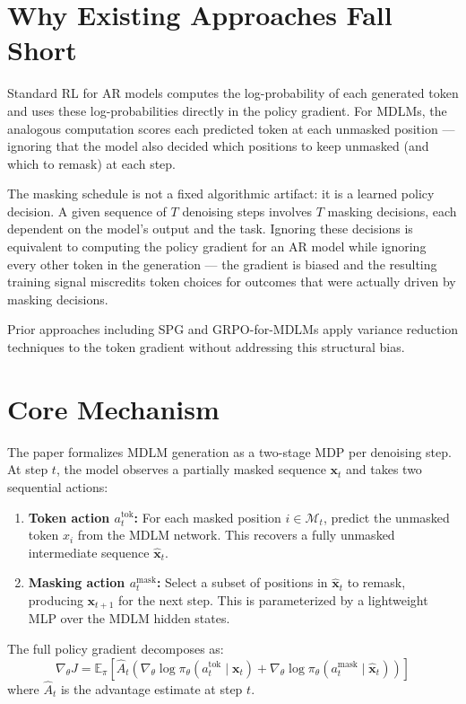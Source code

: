 \documentclass[10pt,twocolumn]{article}
\begin{document}
\section{Why Existing Approaches Fall Short}

Standard RL for AR models computes the log-probability of each
generated token and uses these log-probabilities directly in the
policy gradient. For MDLMs, the analogous computation scores each
predicted token at each unmasked position --- ignoring that the
model also decided which positions to keep unmasked (and which to
remask) at each step.

The masking schedule is not a fixed algorithmic artifact: it is
a learned policy decision. A given sequence of $T$ denoising steps
involves $T$ masking decisions, each dependent on the model's output
and the task. Ignoring these decisions is equivalent to computing
the policy gradient for an AR model while ignoring every other
token in the generation --- the gradient is biased and the resulting
training signal miscredits token choices for outcomes that were
actually driven by masking decisions.

Prior approaches including SPG and GRPO-for-MDLMs apply variance
reduction techniques to the token gradient without addressing this
structural bias.

\section{Core Mechanism}

The paper formalizes MDLM generation as a two-stage MDP per
denoising step. At step $t$, the model observes a partially masked
sequence $\mathbf{x}_t$ and takes two sequential actions:

\begin{enumerate}[itemsep=2pt,parsep=0pt]
  \item \textbf{Token action $a^{\text{tok}}_t$:} For each masked
    position $i \in \mathcal{M}_t$, predict the unmasked token
    $x_i$ from the MDLM network. This recovers a fully unmasked
    intermediate sequence $\hat{\mathbf{x}}_t$.
  \item \textbf{Masking action $a^{\text{mask}}_t$:} Select a
    subset of positions in $\hat{\mathbf{x}}_t$ to remask,
    producing $\mathbf{x}_{t+1}$ for the next step. This is
    parameterized by a lightweight MLP over the MDLM hidden
    states.
\end{enumerate}

The full policy gradient decomposes as:
\[
\nabla_\theta J = \mathbb{E}_\pi \left[ \hat{A}_t \!\left(
  \nabla_\theta \log \pi_\theta(a^{\text{tok}}_t \mid \mathbf{x}_t)
  + \nabla_\theta \log \pi_\theta(a^{\text{mask}}_t \mid \hat{\mathbf{x}}_t)
\right) \right]
\]
where $\hat{A}_t$ is the advantage estimate at step $t$.
\end{document}
